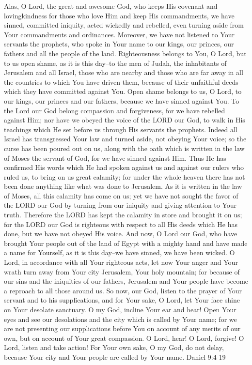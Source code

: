 \documentclass[]{book}
\begin{document}
Alas, O Lord, the great and awesome God, who keeps His covenant and
lovingkindness for those who love Him and keep His commandments, we have
sinned, committed iniquity, acted wickedly and rebelled, even turning
aside from Your commandments and ordinances. Moreover, we have not
listened to Your servants the prophets, who spoke in Your name to our
kings, our princes, our fathers and all the people of the land.
Righteousness belongs to You, O Lord, but to us open shame, as it is
this day--to the men of Judah, the inhabitants of Jerusalem and all
Israel, those who are nearby and those who are far away in all the
countries to which You have driven them, because of their unfaithful
deeds which they have committed against You. Open shame belongs to us, O
Lord, to our kings, our princes and our fathers, because we have sinned
against You. To the Lord our God belong compassion and forgiveness, for
we have rebelled against Him; nor have we obeyed the voice of the LORD
our God, to walk in His teachings which He set before us through His
servants the prophets. Indeed all Israel has transgressed Your law and
turned aside, not obeying Your voice; so the curse has been poured out
on us, along with the oath which is written in the law of Moses the
servant of God, for we have sinned against Him. Thus He has confirmed
His words which He had spoken against us and against our rulers who
ruled us, to bring on us great calamity; for under the whole heaven
there has not been done anything like what was done to Jerusalem. As it
is written in the law of Moses, all this calamity has come on us; yet we
have not sought the favor of the LORD our God by turning from our
iniquity and giving attention to Your truth. Therefore the LORD has kept
the calamity in store and brought it on us; for the LORD our God is
righteous with respect to all His deeds which He has done, but we have
not obeyed His voice. And now, O Lord our God, who have brought Your
people out of the land of Egypt with a mighty hand and have made a name
for Yourself, as it is this day--we have sinned, we have been wicked. O
Lord, in accordance with all Your righteous acts, let now Your anger and
Your wrath turn away from Your city Jerusalem, Your holy mountain; for
because of our sins and the iniquities of our fathers, Jerusalem and
Your people have become a reproach to all those around us. So now, our
God, listen to the prayer of Your servant and to his supplications, and
for Your sake, O Lord, let Your face shine on Your desolate sanctuary. O
my God, incline Your ear and hear! Open Your eyes and see our
desolations and the city which is called by Your name; for we are not
presenting our supplications before You on account of any merits of our
own, but on account of Your great compassion. O Lord, hear! O Lord,
forgive! O Lord, listen and take action! For Your own sake, O my God, do
not delay, because Your city and Your people are called by Your name.
\textbar{} Daniel 9:4-19
\end{document}
